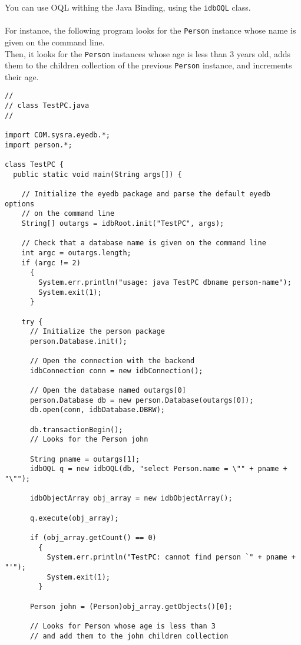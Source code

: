 You can use \eyedb OQL withing the Java Binding, using the \texttt{idbOQL}
class.
\\
\\
For instance, the following program looks for the \texttt{Person} instance whose
name is given on the command line.
\\
Then, it looks for the \texttt{Person} instances whose age is
less than 3 years old, adds them to the children collection of the previous
\texttt{Person} instance, and increments their age.
{\verbsize \begin{verbatim}
//
// class TestPC.java
//

import COM.sysra.eyedb.*;
import person.*;

class TestPC {
  public static void main(String args[]) {

    // Initialize the eyedb package and parse the default eyedb options
    // on the command line
    String[] outargs = idbRoot.init("TestPC", args);
     
    // Check that a database name is given on the command line
    int argc = outargs.length;
    if (argc != 2)
      {
        System.err.println("usage: java TestPC dbname person-name");
        System.exit(1);
      }

    try {
      // Initialize the person package
      person.Database.init();

      // Open the connection with the backend
      idbConnection conn = new idbConnection();

      // Open the database named outargs[0]
      person.Database db = new person.Database(outargs[0]);
      db.open(conn, idbDatabase.DBRW);

      db.transactionBegin();
      // Looks for the Person john

      String pname = outargs[1];
      idbOQL q = new idbOQL(db, "select Person.name = \"" + pname + "\"");

      idbObjectArray obj_array = new idbObjectArray();

      q.execute(obj_array);

      if (obj_array.getCount() == 0)
        {
          System.err.println("TestPC: cannot find person `" + pname + "'");
          System.exit(1);
        }

      Person john = (Person)obj_array.getObjects()[0];

      // Looks for Person whose age is less than 3
      // and add them to the john children collection


\end{verbatim}}
